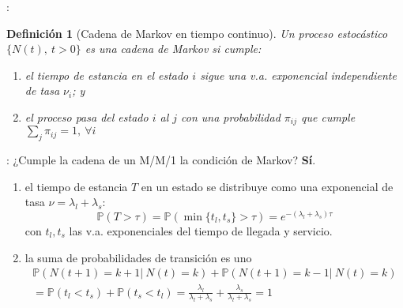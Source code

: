 \documentclass[xcolor={x11names}]{beamer}
\newtheorem{definicion}{Definición}[section]
\begin{document}
\begin{frame}{\secname: \subsecname}
    \begin{definicion}[Cadena de Markov en tiempo continuo\cite{amable}]
        Un proceso estocástico
        $\{N(t),\ t>0\}$ es una cadena de Markov
        si cumple:
        \begin{enumerate}
            \item el tiempo de estancia
                en el estado $i$ sigue
                una v.a. exponencial
                independiente de tasa $\nu_i$; y
            \item el proceso pasa del estado
                $i$ al $j$ con una
                probabilidad $\pi_{ij}$
                que cumple
                $\sum_j \pi_{ij} = 1,\ \forall i$
        \end{enumerate}
    \end{definicion}
\end{frame}




\begin{frame}{\secname: \subsecname}
    ¿Cumple la cadena de un M/M/1 la condición
    de Markov? \pause \textbf{Sí}.

    \vfill

    \begin{enumerate}
        \item el tiempo de estancia $T$ en un
            estado se distribuye como una
            exponencial de tasa
            $\nu=\lambda_l+\lambda_s$:
            \begin{equation*}
                \mathbb{P}(T>\tau)=\mathbb{P}(\min\{t_l,t_s\}>\tau)=e^{-(\lambda_l+\lambda_s)\tau}
            \end{equation*}
            con $t_l,t_s$ las v.a.
            exponenciales del tiempo de
            llegada y servicio.

        \item la suma de probabilidades
            de transición es uno
            \begin{multline*}
                \mathbb{P}(N(t+1)=k+1|\ N(t)=k)
                + \mathbb{P}(N(t+1)=k-1|\ N(t)=k)\\
                = \mathbb{P}(t_l<t_s)
                + \mathbb{P}(t_s<t_l)
                = \frac{\lambda_l}{\lambda_l+\lambda_s}
                + \frac{\lambda_s}{\lambda_l+\lambda_s} = 1
            \end{multline*}
    \end{enumerate}

\end{frame}
\end{document}

